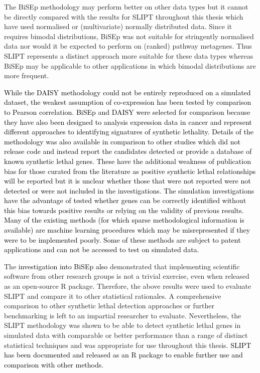 The \gls{BiSEp} methodology may perform better on other data types but it cannot be directly compared with the results for \gls{SLIPT} throughout this thesis which have used normalised or (multivariate) normally distributed data. Since it requires bimodal distributions, \gls{BiSEp} was not suitable for stringently normalised  data nor would it be expected to perform on (ranked) pathway \glspl{metagene}. Thus \gls{SLIPT} represents a distinct approach more suitable for these data types whereas \gls{BiSEp} may be applicable to other applications in which bimodal distributions are more frequent.

\textcolor{black}{
While the \gls{DAISY} methodology \citep{Jerby2014} could not be entirely reproduced on a simulated dataset, the weakest assumption of co-expression \citep{Lu2015} has been tested by comparison to Pearson correlation. \gls{BiSEp} and \gls{DAISY} were selected for comparison because they have also been designed to analysis expression data in cancer and represent different approaches to identifying signatures of synthetic lethality. Details of the methodology was also available in comparison to other studies which did not release code and instead report the candidates detected or provide a database of known synthetic lethal genes. These have the additional weakness of publication bias for those curated from the literature as positive synthetic lethal relationships will be reported but it is unclear whether those that were not reported were not detected or were not included in the investigations. The simulation investigations have the advantage of tested whether genes can be correctly identified without this bias towards positive results or relying on the validity of previous results. Many of the existing methods (for which sparse methodological information is available) are machine learning procedures which may be misrepresented if they were to be implemented poorly. Some of these methods are subject to patent applications and can not be accessed to test on simulated data. 
}

The \textcolor{black}{investigation into \gls{BiSEp} also} demonstrated that implementing scientific software from other research groups is not a trivial exercise, even when released as an open-source R package. Therefore, the above results were used to evaluate \gls{SLIPT} and compare it to other statistical rationales. A comprehensive comparison to other \gls{synthetic lethal} detection approaches or further benchmarking is left to an impartial researcher to evaluate. Nevertheless, the \gls{SLIPT} methodology was shown to be able to detect \gls{synthetic lethal} genes in simulated data with comparable or better performance than a range of distinct statistical techniques and was appropriate for use throughout this thesis. \textcolor{black}{SLIPT has been documented and released as an R package to enable further use and comparison with other methods.}

